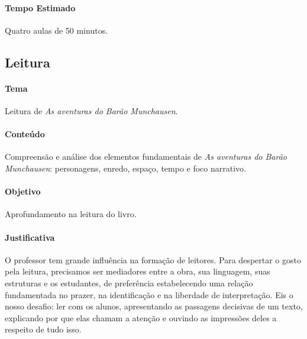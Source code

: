 \documentclass[11pt]{extarticle}
\begin{document}
\paragraph{Tempo Estimado} Quatro aulas de 50 minutos. 

\subsection{Leitura}


\paragraph{Tema} Leitura de \textit{As aventuras do Barão Munchausen}.  

\paragraph{Conteúdo} Compreensão e análise dos elementos fundamentais de \textit{As aventuras do Barão Munchausen}: personagens, enredo, espaço, tempo e foco narrativo.  

\paragraph{Objetivo} Aprofundamento na leitura do livro.   

\paragraph{Justificativa} O professor tem grande influência na formação de leitores. Para despertar o gosto pela leitura, precisamos ser mediadores entre a obra, sua linguagem, suas estruturas e os estudantes, de preferência estabelecendo uma relação fundamentada no prazer, na identificação e na liberdade de interpretação. Eis o nosso desafio: ler com os alunos, apresentando as passagens decisivas de um texto, explicando por que elas chamam a atenção e  ouvindo as impressões deles a respeito de tudo isso. 
\end{document}
